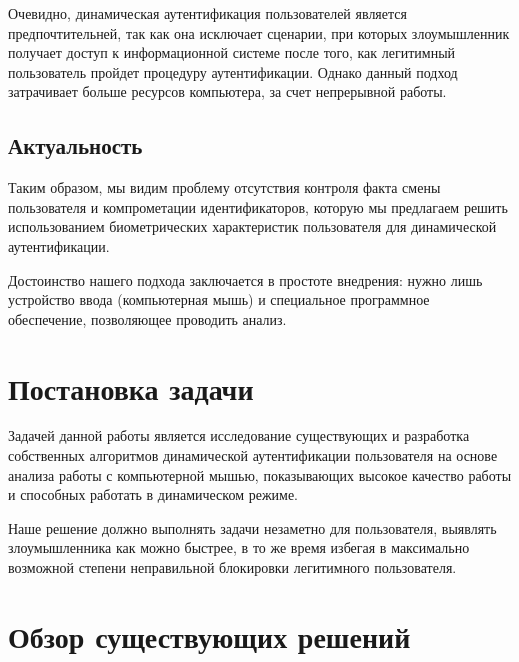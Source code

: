 \documentclass[12pt]{article}
\begin{document}
    \par Очевидно, динамическая аутентификация пользователей является предпочтительней, так как она исключает сценарии, при которых злоумышленник получает доступ к информационной системе после того, как легитимный пользователь пройдет процедуру аутентификации. Однако данный подход затрачивает больше ресурсов компьютера, за счет непрерывной работы.


    \subsection{Актуальность}
    \label{sec:Intro:Relevance}

    \par Таким образом, мы видим проблему отсутствия контроля факта смены пользователя и компрометации идентификаторов, которую мы предлагаем решить использованием биометрических характеристик пользователя для динамической аутентификации.

    \par Достоинство нашего подхода заключается в простоте внедрения: нужно лишь устройство ввода (компьютерная мышь) и специальное программное обеспечение, позволяющее проводить анализ.

    \newpage



    \section{Постановка задачи}
    \label{sec:FormulationOfProblem}
    
    \par Задачей данной работы является исследование существующих и разработка собственных алгоритмов динамической аутентификации пользователя на основе анализа работы с компьютерной мышью, показывающих высокое качество работы и способных работать в динамическом режиме.

    \par Наше решение должно выполнять задачи незаметно для пользователя, выявлять злоумышленника как можно быстрее, в то же время избегая в максимально возможной степени неправильной блокировки легитимного пользователя.

    \newpage



    \section{Обзор существующих решений}
    \label{sec:Overview}
\end{document}
